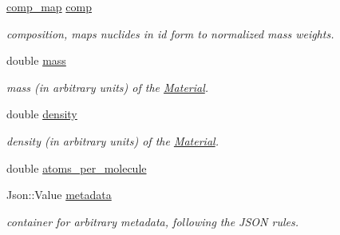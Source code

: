 \begin{DoxyCompactItemize}
\item 
\hypertarget{classpyne_1_1_material_a2b0e850a66f2b8cb2b106307a00a18ed}{\hyperlink{namespacepyne_a86738cecccf4ce3f4ecc2ff6f45ce1a2}{comp\+\_\+map} \hyperlink{classpyne_1_1_material_a2b0e850a66f2b8cb2b106307a00a18ed}{comp}}\label{classpyne_1_1_material_a2b0e850a66f2b8cb2b106307a00a18ed}

\begin{DoxyCompactList}\small\item\em composition, maps nuclides in id form to normalized mass weights. \end{DoxyCompactList}\item 
\hypertarget{classpyne_1_1_material_a729ebba0be2879f26f1fcf3b100d3b5d}{double \hyperlink{classpyne_1_1_material_a729ebba0be2879f26f1fcf3b100d3b5d}{mass}}\label{classpyne_1_1_material_a729ebba0be2879f26f1fcf3b100d3b5d}

\begin{DoxyCompactList}\small\item\em mass (in arbitrary units) of the \hyperlink{classpyne_1_1_material}{Material}. \end{DoxyCompactList}\item 
\hypertarget{classpyne_1_1_material_a916eb7ed0143844a505c454d47755ab0}{double \hyperlink{classpyne_1_1_material_a916eb7ed0143844a505c454d47755ab0}{density}}\label{classpyne_1_1_material_a916eb7ed0143844a505c454d47755ab0}

\begin{DoxyCompactList}\small\item\em density (in arbitrary units) of the \hyperlink{classpyne_1_1_material}{Material}. \end{DoxyCompactList}\item 
double \hyperlink{classpyne_1_1_material_a7ddff1aaebc94bcda22d3422c093a756}{atoms\+\_\+per\+\_\+molecule}
\item 
\hypertarget{classpyne_1_1_material_aee299ae39a32a7ff98e14c2aa3eabe32}{Json\+::\+Value \hyperlink{classpyne_1_1_material_aee299ae39a32a7ff98e14c2aa3eabe32}{metadata}}\label{classpyne_1_1_material_aee299ae39a32a7ff98e14c2aa3eabe32}

\begin{DoxyCompactList}\small\item\em container for arbitrary metadata, following the J\+S\+O\+N rules. \end{DoxyCompactList}\end{DoxyCompactItemize}
